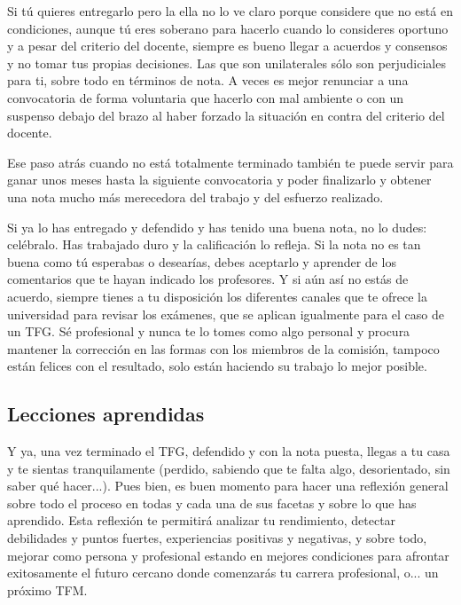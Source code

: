 Si tú quieres entregarlo pero la ella no lo ve claro porque considere que no está en condiciones, aunque tú eres soberano para hacerlo cuando lo consideres oportuno y a pesar del criterio del docente, siempre es bueno llegar a acuerdos y consensos y no tomar tus propias decisiones. Las que son unilaterales sólo son perjudiciales para ti, sobre todo en términos de nota. A veces es mejor renunciar a una convocatoria de forma voluntaria que hacerlo con mal ambiente o con un suspenso debajo del brazo al haber forzado la situación en contra del criterio del docente.

Ese paso atrás cuando no está totalmente terminado también te puede servir para ganar unos meses hasta la siguiente convocatoria y poder finalizarlo y obtener una nota mucho más merecedora del trabajo y del esfuerzo realizado. 

Si ya lo has entregado y defendido y has tenido una buena nota, no lo dudes: celébralo. Has trabajado duro y la calificación lo refleja. Si la nota no es tan buena como tú esperabas o desearías, debes aceptarlo y aprender de los comentarios que te hayan indicado los profesores.  Y si aún así no estás de acuerdo, siempre tienes a tu disposición los diferentes canales que  te ofrece la universidad para revisar los exámenes, que se aplican igualmente para el caso de un TFG. Sé profesional y nunca te lo tomes como algo personal y procura mantener la corrección en las formas con los miembros de la comisión, tampoco están felices con el resultado, solo están haciendo su trabajo lo mejor posible. 

\subsection{Lecciones aprendidas}

Y ya, una vez terminado el TFG, defendido y con la nota puesta, llegas a tu casa y te sientas tranquilamente (perdido, sabiendo que te falta algo, desorientado, sin saber qué hacer...). Pues bien, es buen momento para hacer una reflexión general sobre todo el proceso en todas y cada una de sus facetas y sobre lo que has aprendido. Esta reflexión te permitirá analizar tu rendimiento, detectar debilidades y puntos fuertes, experiencias positivas y negativas, y sobre todo, mejorar como persona y profesional estando en mejores condiciones para afrontar exitosamente el futuro cercano donde comenzarás tu carrera profesional, o... un próximo TFM.

